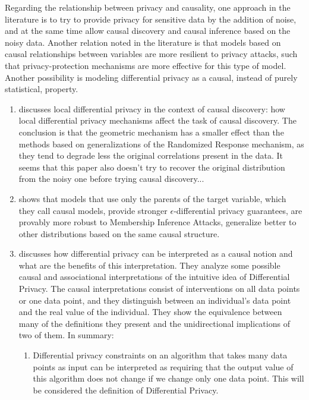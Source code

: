 Regarding the relationship between privacy and causality, one approach in the literature is to try to provide privacy for sensitive data by the addition of noise, and at the same time allow causal discovery and causal inference based on the noisy data. Another relation noted in the literature is that models based on causal relationships between variables are more resilient to privacy attacks, such that privacy-protection mechanisms are more effective for this type of model. Another possibility is modeling differential privacy as a causal, instead of purely statistical, property. 

\begin{enumerate}
\item \cite{binkyte2024causal} discusses local differential privacy in the context of causal discovery: how local differential privacy mechanisms affect the task of causal discovery. The conclusion is that the geometric mechanism has a smaller effect than the methods based on generalizations of the Randomized Response mechanism, as they tend to degrade less the original correlations present in the data. It seems that this paper also doesn't try to recover the original distribution from the noisy one before trying causal discovery...
\item \cite{tople2020alleviating} shows that models that use only the parents of the target variable, which they call causal models, provide stronger $\epsilon$-differential privacy guarantees, are provably more robust to Membership Inference Attacks, generalize better to other distributions based on the same causal structure.
\item \cite{tschantz2020sok} discusses how differential privacy can be interpreted as a causal notion and what are the benefits of this interpretation. They analyze some possible causal and associational interpretations of the intuitive idea of Differential Privacy. The causal interpretations consist of interventions on all data points or one data point, and they distinguish between an individual's data point and the real value of the individual. They show the equivalence between many of the definitions they present and the unidirectional implications of two of them. In summary: \begin{enumerate}
    \item Differential privacy constraints on an algorithm that takes many data points as input can be interpreted as requiring that the output value of this algorithm does not change if we change only one data point. This will be considered the definition of Differential Privacy.

\end{enumerate}
\end{enumerate}
